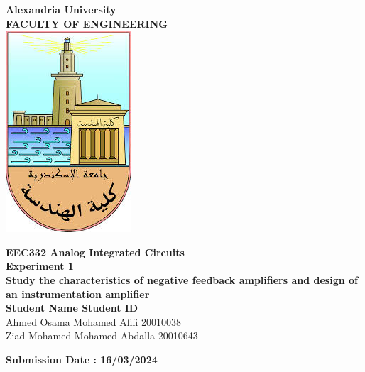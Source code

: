 \documentclass[a4paper, 12pt, english]{article}
\begin{document}
\begin{titlepage}
\begin{center}
\textbf{\LARGE Alexandria University}\\[0.5cm] 
\textbf{\large FACULTY OF ENGINEERING}\\[0.2cm]
\vspace{20pt}
\includegraphics{logo.png}\\[1cm]
\par
\vspace{20pt}
\textbf{\Large EEC332 Analog Integrated Circuits}\\
\vspace{15pt}
\myrule[1pt][7pt]
\textbf{\LARGE  Experiment 1}\\
\vspace{15pt}
\textbf{\large Study the characteristics of negative feedback amplifiers and design of an instrumentation amplifier}\\
\myrule[1pt][7pt]
\vspace{25pt}
\textbf{\large \hspace{50pt}Student Name \hspace{60pt} Student ID}\\
Ahmed Osama Mohamed Afifi \hspace{60pt} 20010038 \\
Ziad Mohamed Mohamed Abdalla \hspace{40pt} 20010643 \\

\vspace{45pt}
\end{center}

\par
\vfill
\begin{center}
\textbf{Submission Date : 16/03/2024}\\
\end{center}

\end{titlepage}
\end{document}
